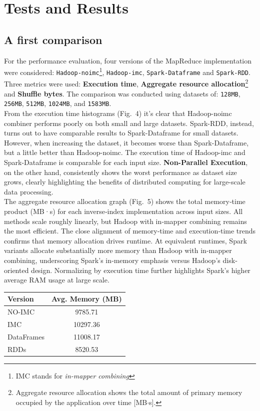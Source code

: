 \section{Tests and Results}

\subsection{A first comparison}
For the performance evaluation, four versions of the MapReduce implementation were considered: 
\texttt{Hadoop-noimc}\footnote{IMC stands for \textit{in-mapper combining}}, 
\texttt{Hadoop-imc}, \texttt{Spark-Dataframe} and \texttt{Spark-RDD}. Three metrics were used: \textbf{Execution time}, \textbf{Aggregate resource allocation}\footnote{Aggregate resource allocation shows the total amount of primary memory occupied by the application over time [MB$\cdot$s].} and \textbf{Shuffle bytes}. The comparison was conducted using datasets of: 
\texttt{128MB}, \texttt{256MB}, \texttt{512MB}, \texttt{1024MB}, and \texttt{1583MB}.\\
From the execution time histograms (Fig.~4) it's clear that Hadoop-noimc combiner performs poorly on both small and large datasets. Spark-RDD, instead, turns out to have comparable results to Spark-Dataframe for small datasets. However, when increasing the dataset, it becomes worse than Spark-Dataframe, but a little better than Hadoop-noimc. The execution time of Hadoop-imc and Spark-Dataframe is comparable for each input size. \textbf{Non-Parallel Execution}, on the other hand, consistently shows the worst performance as dataset size grows, clearly highlighting the benefits of distributed computing for large-scale data processing.\\
The aggregate resource allocation graph (Fig.~5) shows the total memory‐time product (MB·s) for each inverse‐index implementation across input sizes. All methods scale roughly linearly, but Hadoop with in‐mapper combining remains the most efficient. The close alignment of memory‐time and execution‐time trends confirms that memory allocation drives runtime. At equivalent runtimes, Spark variants allocate substantially more memory than Hadoop with in‐mapper combining, underscoring Spark's in‐memory emphasis versus Hadoop's disk‐oriented design. Normalizing by execution time further highlights Spark’s higher average RAM usage at large scale. 
\begin{table}[H]
	\centering
	\begin{tabular}{lc}
		\hline
		\textbf{Version} & \textbf{Avg. Memory (MB)} \\
		\hline
		NO-IMC    & 9785.71 \\
		IMC  & 10297.36 \\
		DataFrames & 11008.17 \\
		RDDs       & 8520.53 \\
		\hline
	\end{tabular}
	\label{tab:avg-mem}
\end{table}
